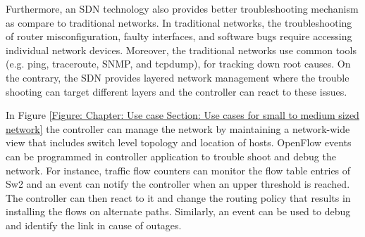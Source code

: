 Furthermore, an SDN technology also provides better troubleshooting mechanism as compare to traditional networks. In traditional networks, the troubleshooting of router misconfiguration, faulty interfaces, and software bugs require accessing individual network devices. Moreover, the traditional networks use common tools (e.g. ping, traceroute, SNMP, and tcpdump), for tracking down root causes. On the contrary, the SDN provides layered network management where the trouble shooting can target different layers and the controller can react to these issues. 
 
In Figure \ref{Figure: Chapter: Use case Section: Use cases for small to medium sized network} the controller can manage the network by maintaining a network-wide view that includes switch level topology and location of hosts. OpenFlow events can be programmed in controller application to trouble shoot and debug the network. For instance, traffic flow counters can monitor the flow table entries of Sw2 and an event can notify the controller when an upper threshold is reached. The controller can then react to it and change the routing policy that results in installing the flows on alternate paths. Similarly, an event can be used to debug and identify the link in cause of outages. 



